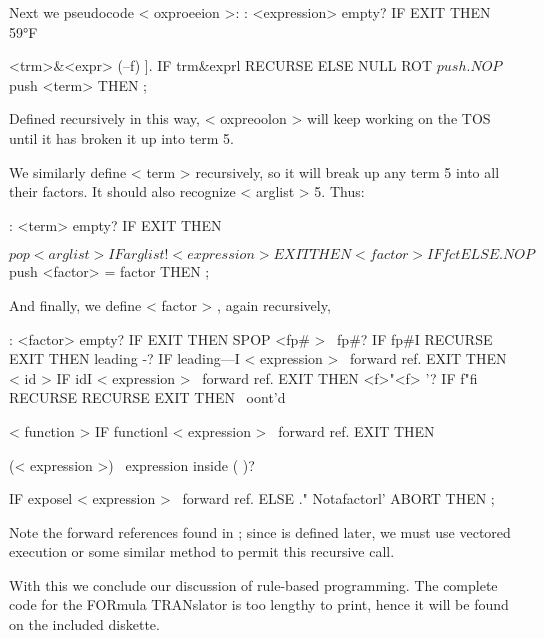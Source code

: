 Next we pseudocode < oxproeeion >:
: <expression> empty? IF EXIT THEN
59°F

<trm>&<expr> (--f) \splitat].
IF trm&exprl RECURSE
ELSE NULL ROT $push
.NOP $push <term>
THEN ;

Defined recursively in this way, < oxpreoolon > will keep
working on the TOS until it has broken it up into term 5.

We similarly define < term > recursively, so it will break up any
term 5 into all their factors. It should also recognize < arglist > 5.
Thus:

: <term> empty? IF EXIT THEN

$pop < arglist >
IF arglist! < expression > EXIT THEN
<factor>%

IF fct%
ELSE .NOP $push <factor> \term = factor
THEN ;

And finally, we define < factor > , again recursively,

: <factor> empty? IF EXIT THEN \done
SPOP <fp# > \ fp#?
IF fp#I RECURSE EXIT THEN
leading -?
IF leading—I < expression > \ forward ref.
EXIT THEN
< id > IF idI < expression > \ forward ref.
EXIT THEN
<f>"<f> \exponent’?
IF f"fi RECURSE RECURSE
EXIT THEN
\ oont'd

< function >
IF functionl < expression > \ forward ref.
EXIT THEN

(< expression >) \ expression inside ( )?

IF exposel < expression > \ forward ref.
ELSE ." Notafactorl' ABORT THEN ;

Note the forward references found in ; since  is defined later, we must use vectored execution or some similar method to permit this recursive call.

With this we conclude our discussion of rule-based programming. The complete code for the FORmula TRANslator is too lengthy to print, hence it will be found on the included diskette.